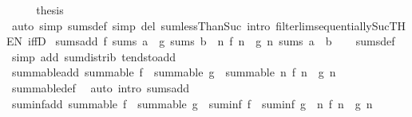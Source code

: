 \begin{isabellebody}
\ \ \isamarkupfalse%
\ \isamarkupfalse%
\ {\isacharquery}{\kern0pt}thesis\isanewline
\ \ \ \ \isamarkupfalse%
\ {\isacharparenleft}{\kern0pt}auto\ simp{\isacharcolon}{\kern0pt}\ sums{\isacharunderscore}{\kern0pt}def\ simp\ del{\isacharcolon}{\kern0pt}\ sum{\isachardot}{\kern0pt}lessThan{\isacharunderscore}{\kern0pt}Suc\ intro{\isacharcolon}{\kern0pt}\ filterlim{\isacharunderscore}{\kern0pt}sequentially{\isacharunderscore}{\kern0pt}Suc{\isacharbrackleft}{\kern0pt}THEN\ iffD{}{\isacharbrackright}{\kern0pt}{\isacharparenright}{\kern0pt}\isanewline
{}\isamarkupfalse%
%
\endisatagproof
{\isafoldproof}%
%
\isadelimproof
\isanewline
%
\endisadelimproof
\isanewline
{}\isamarkupfalse%
\ sums{\isacharunderscore}{\kern0pt}add{\isacharcolon}{\kern0pt}\ {\isachardoublequoteopen}f\ sums\ a\ {\isasymLongrightarrow}\ g\ sums\ b\ {\isasymLongrightarrow}\ {\isacharparenleft}{\kern0pt}{\isasymlambda}n{\isachardot}{\kern0pt}\ f\ n\ {\isacharplus}{\kern0pt}\ g\ n{\isacharparenright}{\kern0pt}\ sums\ {\isacharparenleft}{\kern0pt}a\ {\isacharplus}{\kern0pt}\ b{\isacharparenright}{\kern0pt}{\isachardoublequoteclose}\isanewline
%
\isadelimproof
\ \ %
\endisadelimproof
%
\isatagproof
{}\isamarkupfalse%
\ sums{\isacharunderscore}{\kern0pt}def\ \isamarkupfalse%
\ {\isacharparenleft}{\kern0pt}simp\ add{\isacharcolon}{\kern0pt}\ sum{\isachardot}{\kern0pt}distrib\ tendsto{\isacharunderscore}{\kern0pt}add{\isacharparenright}{\kern0pt}%
\endisatagproof
{\isafoldproof}%
%
\isadelimproof
\isanewline
%
\endisadelimproof
\isanewline
{}\isamarkupfalse%
\ summable{\isacharunderscore}{\kern0pt}add{\isacharcolon}{\kern0pt}\ {\isachardoublequoteopen}summable\ f\ {\isasymLongrightarrow}\ summable\ g\ {\isasymLongrightarrow}\ summable\ {\isacharparenleft}{\kern0pt}{\isasymlambda}n{\isachardot}{\kern0pt}\ f\ n\ {\isacharplus}{\kern0pt}\ g\ n{\isacharparenright}{\kern0pt}{\isachardoublequoteclose}\isanewline
%
\isadelimproof
\ \ %
\endisadelimproof
%
\isatagproof
{}\isamarkupfalse%
\ summable{\isacharunderscore}{\kern0pt}def\ \isamarkupfalse%
\ {\isacharparenleft}{\kern0pt}auto\ intro{\isacharcolon}{\kern0pt}\ sums{\isacharunderscore}{\kern0pt}add{\isacharparenright}{\kern0pt}%
\endisatagproof
{\isafoldproof}%
%
\isadelimproof
\isanewline
%
\endisadelimproof
\isanewline
{}\isamarkupfalse%
\ suminf{\isacharunderscore}{\kern0pt}add{\isacharcolon}{\kern0pt}\ {\isachardoublequoteopen}summable\ f\ {\isasymLongrightarrow}\ summable\ g\ {\isasymLongrightarrow}\ suminf\ f\ {\isacharplus}{\kern0pt}\ suminf\ g\ {\isacharequal}{\kern0pt}\ {\isacharparenleft}{\kern0pt}{\isasymSum}n{\isachardot}{\kern0pt}\ f\ n\ {\isacharplus}{\kern0pt}\ g\ n{\isacharparenright}{\kern0pt}{\isachardoublequoteclose}\isanewline

\end{isabellebody}
